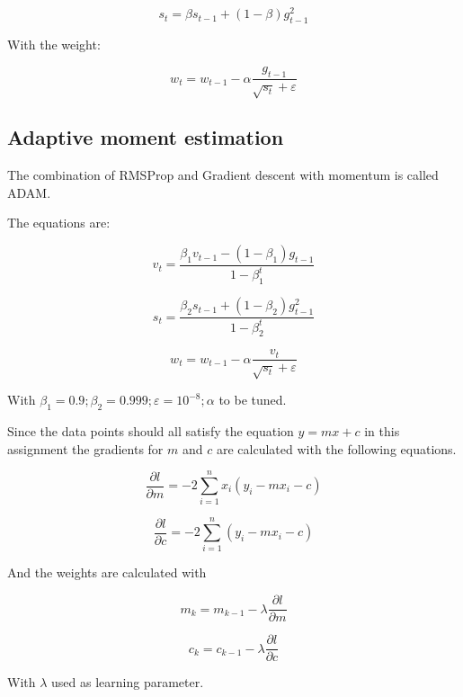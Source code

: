 \begin{equation}\label{RMS1}
    s_t = \beta s_{t-1} + (1 - \beta)g^2_{t-1}
\end{equation}

With the weight:

\begin{equation}\label{RMS2}
    w_t = w_{t-1} - \alpha \frac{g_{t-1}}{\sqrt{s_t}+\varepsilon}
\end{equation}

\subsection{Adaptive moment estimation}

The combination of \ac{RMSProp} and Gradient descent with momentum is called \ac{ADAM}.

The equations are:


\begin{equation}\label{ADAM1}
    v_t = \frac{\beta_1 v_{t-1} - (1 - \beta_1)g_{t-1}}{1 - \beta^t_1}
\end{equation}

\begin{equation}\label{ADAM2}
    s_t = \frac{\beta_2 s_{t-1} + (1 - \beta_2)g^2_{t-1}}{1 - \beta^t_2}
\end{equation}

\begin{equation}\label{RMS2}
    w_t = w_{t-1} - \alpha \frac{v_t}{\sqrt{s_t}+\varepsilon}
\end{equation}

With $\beta_1 = 0.9; \beta_2 = 0.999; \varepsilon = 10^{-8}; \alpha $ to be tuned.

Since the data points should all satisfy the equation $y = mx + c$ in this assignment the gradients for $m$ and $c$ are calculated with the following equations.

\begin{equation}\label{gradients1}
    \frac{\partial l}{\partial m} = -2 \sum\limits_{i=1}^n x_i (y_i - mx_i - c)
\end{equation}

\begin{equation}\label{gradients2}
    \frac{\partial l}{\partial c} = -2 \sum\limits_{i=1}^n (y_i - mx_i - c)
\end{equation}

And the weights are calculated with

\begin{equation}\label{gradients2}
    m_k = m_{k-1} - \lambda \frac{\partial l}{\partial m}
\end{equation}

\begin{equation}\label{gradients2}
    c_k = c_{k-1} - \lambda \frac{\partial l}{\partial c}
\end{equation}

With $\lambda$ used as learning parameter.


